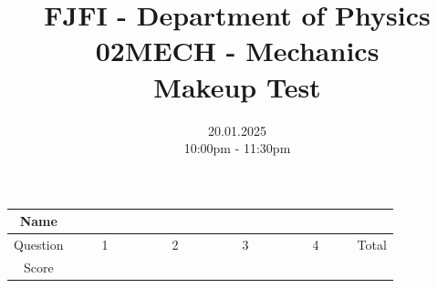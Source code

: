 \documentclass[a4paper,12pt]{article}
\title{{\Large FJFI - Department of Physics} \\ 
                  02MECH - Mechanics \\ 
          {\Large \textbf{Makeup Test}}\vspace{-1cm}}
\date{20.01.2025 \\ 10:00pm - 11:30pm}
\author{}
\begin{document}
\maketitle
\vspace{-1.5em}

\begin{center}
    \renewcommand{\arraystretch}{2}
    \begin{tabular}{ |c|c|c|c|c|c| } 
        \hline
        Name& \multicolumn{5}{c|}{\phantom{~~~~~~~~~~~~~~~~~~~~~~~~~~~~~~~~~~~~~~~~~~~~~~~~~~~~~~~~~~~~~~~~~~~~~~~~~~~~~~~}}\\
        \hline
        Question & ~~~~1~~~~ & ~~~~2~~~~ & ~~~~3~~~~ & ~~~~4~~~~ & Total \\ 
        \hline
        Score & &  & & & \\
        \hline
    \end{tabular}
\end{center}

\vspace*{1cm}







\end{document}
